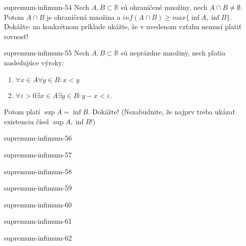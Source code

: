 \begin{defproblem}{supremum-infimum-54}
Nech $A,B\subset\mathbb{R}$ sú ohraničené množiny, nech $A\cap B\neq\emptyset$. Potom $A\cap B$ je ohraničená množina a $inf(A\cap B)\geq max \{\inf A,\inf B\}$. Dokážte: na konkrétnom príklade ukážte, že v uvedenom vzťahu nemusí platiť rovnosť!
\end{defproblem}

\begin{defproblem}{supremum-infimum-55}
Nech $A,B\subset\mathbb{R}$ sú neprázdne množiny, nech platia nasledujúce výroky:
\begin{enumerate}
\item $\forall x\in A \forall y\in B: x<y$
\item $\forall \varepsilon>0 \exists x\in A \exists y\in B:y-x<\varepsilon$.
\end{enumerate}
Potom platí $\sup A =\inf B$. Dokážte! (Nezabudnite, že najprv treba ukázať existenciu čísel $\sup A,\inf B$!)
\end{defproblem}

\begin{defproblem}{supremum-infimum-56}

\end{defproblem}

\begin{defproblem}{supremum-infimum-57}

\end{defproblem}

\begin{defproblem}{supremum-infimum-58}

\end{defproblem}

\begin{defproblem}{supremum-infimum-59}

\end{defproblem}

\begin{defproblem}{supremum-infimum-60}

\end{defproblem}

\begin{defproblem}{supremum-infimum-61}

\end{defproblem}

\begin{defproblem}{supremum-infimum-62}

\end{defproblem}

